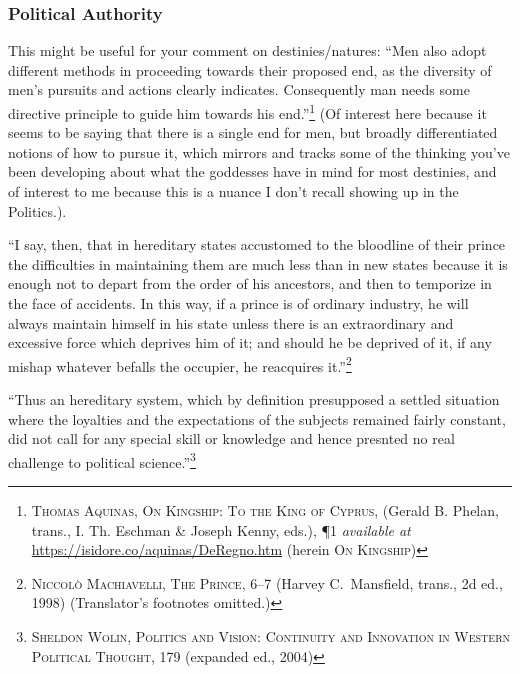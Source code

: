 \documentclass[../FGP.tex]{subfiles}
\begin{document}
\subsubsection{Political Authority}
This might be useful for your comment on destinies/natures: ``Men also adopt different methods in proceeding towards their proposed end, as the diversity of men’s pursuits and actions clearly indicates. Consequently man needs some directive principle to guide him towards his end.''\footnote{\label{note:aquinas}\textsc{Thomas Aquinas, On Kingship: To the King of Cyprus}, (Gerald B. Phelan, trans., I. Th. Eschman \& Joseph Kenny, eds.), \P1 \textit{available at} \url{https://isidore.co/aquinas/DeRegno.htm} (herein \textsc{On Kingship})} (Of interest here because it seems to be saying that there is a single end for men, but broadly differentiated notions of how to pursue it, which mirrors and tracks some of the thinking you've been developing about what the goddesses have in mind for most destinies, and of interest to me because this is a nuance I don't recall showing up in the Politics.).

``I say, then, that in hereditary states accustomed to the bloodline of their prince the difficulties in maintaining them are much less than in new states because it is enough not to depart from the order of his ancestors, and then to temporize in the face of accidents. In this way, if a prince is of ordinary industry, he will always maintain himself in his state unless there is an extraordinary and excessive force which deprives him of it; and should he be deprived of it, if any mishap whatever befalls the occupier, he reacquires it.''\footnote{\textsc{Niccolò Machiavelli, The Prince}, 6--7 (Harvey C.~Mansfield, trans., 2d ed., 1998) (Translator's footnotes omitted.)}

``Thus an hereditary system, which by definition presupposed a settled situation where the loyalties and the expectations of the subjects remained fairly constant, did not call for any special skill or knowledge and hence presnted no real challenge to political science.''\footnote{\textsc{Sheldon Wolin, Politics and Vision: Continuity and Innovation in Western Political Thought}, 179 (expanded ed., 2004)}
\end{document}
